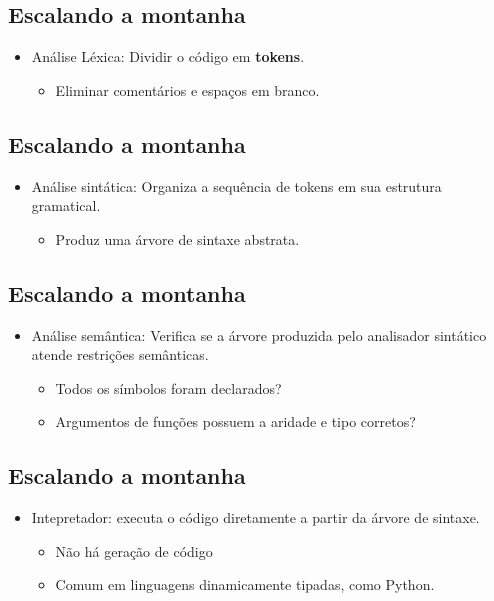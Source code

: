 \documentclass[11pt]{article}
\begin{document}
\subsection*{Escalando a montanha}
\label{sec:org598c3ef}

\begin{itemize}
\item Análise Léxica: Dividir o código em \textbf{\textbf{tokens}}.
\begin{itemize}
\item Eliminar comentários e espaços em branco.
\end{itemize}
\end{itemize}
\subsection*{Escalando a montanha}
\label{sec:orge925c9c}

\begin{itemize}
\item Análise sintática: Organiza a sequência de tokens em sua estrutura gramatical.
\begin{itemize}
\item Produz uma árvore de sintaxe abstrata.
\end{itemize}
\end{itemize}
\subsection*{Escalando a montanha}
\label{sec:orgfcac9ba}

\begin{itemize}
\item Análise semântica: Verifica se a árvore produzida pelo analisador sintático atende restrições semânticas.
\begin{itemize}
\item Todos os símbolos foram declarados?
\item Argumentos de funções possuem a aridade e tipo corretos?
\end{itemize}
\end{itemize}
\subsection*{Escalando a montanha}
\label{sec:orgd43d5b9}

\begin{itemize}
\item Intepretador: executa o código diretamente a partir da árvore de sintaxe.
\begin{itemize}
\item Não há geração de código
\item Comum em linguagens dinamicamente tipadas, como Python.
\end{itemize}
\end{itemize}
\end{document}
